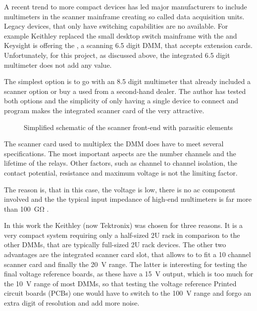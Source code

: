 A recent trend to more compact devices has led major manufacturers to include multimeters in the scanner mainframe creating so called data acquisition units. Legacy devices, that only have switching capabilities are no available. For example Keithley replaced the small desktop switch mainframe  with the  and Keysight is offering the , a scanning \num{6.5} digit DMM, that accepts extension cards. Unfortunately, for this project, as discussed above, the integrated \num{6.5} digit multimeter does not add any value.

The simplest option is to go with an \num{8.5} digit multimeter that already included a scanner option or buy a used  from a second-hand dealer. The author has tested both options and the simplicity of only having a single device to connect and program makes the integrated scanner card of the  very attractive.

\begin{figure}[ht]
    \centering
    \caption{Simplified schematic of the scanner front-end with parasitic elements}
\end{figure}

The scanner card used to multiplex the DMM does have to meet several specifications. The most important aspects are the number channels and the lifetime of the relays. Other factors, such as channel to channel isolation, the contact potential, resistance and maximum voltage is not the limiting factor.

The reason is, that in this case, the voltage is low, there is no ac component involved and the the typical input impedance of high-end multimeters is far more than \qty{100}{\giga\ohm} \cite{datasheet_fluke8588A,article_3458A_input_mpedance_2,datasheet_keithley2002,article_3458A_input_mpedance}.



In this work the Keithley (now Tektronix)  was chosen for three reasons. It is a very compact system requiring only a half-sized 2U rack in comparison to the other DMMs, that are typically full-sized 2U rack devices. The other two advantages are the integrated scanner card slot, that allows to to fit a 10 channel scanner card and finally the \qty{20}{\volt} range. The latter is interesting for testing the final voltage reference boards, as these have a \qty{15}{\volt} output, which is too much for the \qty{10}{\volt} range of most DMMs, so that testing the voltage reference Printed circuit boards
(PCBs) one would have to switch to the \qty{100}{\volt} range and forgo an extra digit of resolution and add more noise.



